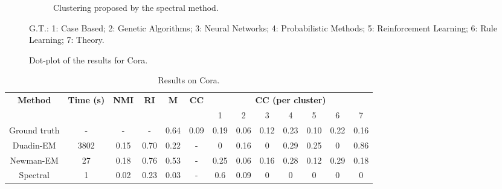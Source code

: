 \documentclass[switch, 12pt]{article}
\begin{document}
\begin{figure}[H]
\begin{subfigure}{0.45\linewidth}
        \caption{Clustering proposed by the spectral method.}
        \label{fig:cora_spectral}
    \end{subfigure}
    \hfill
    \caption{Dot-plot of the results for Cora.}
    \scriptsize{G.T.: 1: Case Based; 2: Genetic Algorithms; 3: Neural Networks; 4: Probabilistic Methods; 5: Reinforcement Learning; 6: Rule Learning; 7: Theory.}
    \label{fig:cora_results}
\end{figure}

\begin{table}[H]
    \centering
    \setlength\heavyrulewidth{0.25ex}
    \begin{tabular}{@{}ccccccccccccc@{}}
        \toprule
        \multirow{2}{*}{\textbf{Method}}  & \multirow{2}{*}{\textbf{Time (s)}} & \multirow{2}{*}{\textbf{NMI}} & \multirow{2}{*}{\textbf{RI}} & \multirow{2}{*}{\textbf{M}} & \multirow{2}{*}{\textbf{CC}} & \multicolumn{7}{c}{\textbf{CC (per cluster)}}                                           \\
                                          &                                    &                               &                              &                             &                              & 1                                             & 2    & 3    & 4    & 5    & 6    & 7    \\ \midrule
        \multicolumn{1}{c|}{Ground truth} & \multicolumn{1}{c|}{-}             & -                             & \multicolumn{1}{c|}{-}       & 0.64                        & 0.09                         & 0.19                                          & 0.06 & 0.12 & 0.23 & 0.10 & 0.22 & 0.16 \\
        \multicolumn{1}{c|}{Duadin-EM}    & \multicolumn{1}{c|}{3802}          & 0.15                          & \multicolumn{1}{c|}{0.70}    & 0.22                        & -                            & 0                                             & 0.16 & 0    & 0.29 & 0.25 & 0    & 0.86 \\
        \multicolumn{1}{c|}{Newman-EM}    & \multicolumn{1}{c|}{27}            & 0.18                          & \multicolumn{1}{c|}{0.76}    & 0.53                        & -                            & 0.25                                          & 0.06 & 0.16 & 0.28 & 0.12 & 0.29 & 0.18 \\
        \multicolumn{1}{c|}{Spectral}     & \multicolumn{1}{c|}{1}             & 0.02                          & \multicolumn{1}{c|}{0.23}    & 0.03                        & -                            & 0.6                                           & 0.09 & 0    & 0    & 0    & 0    & 0    \\ \bottomrule
    \end{tabular}
    \caption{Results on Cora.}
    \label{tab:cora_results}
\end{table}
\end{document}
